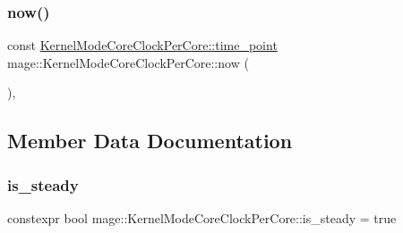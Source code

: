 \subsubsection{\texorpdfstring{now()}{now()}}
{\footnotesize\ttfamily const \hyperlink{structmage_1_1_kernel_mode_core_clock_per_core_a26d0fe6b051dab6987956f52414659cc}{Kernel\+Mode\+Core\+Clock\+Per\+Core\+::time\+\_\+point} mage\+::\+Kernel\+Mode\+Core\+Clock\+Per\+Core\+::now (\begin{DoxyParamCaption}{ }\end{DoxyParamCaption})\hspace{0.3cm}{\ttfamily [static]}, {\ttfamily [noexcept]}}



\subsection{Member Data Documentation}
\hypertarget{structmage_1_1_kernel_mode_core_clock_per_core_a8b87465ab1497015a4f6436fd4637645}{}\label{structmage_1_1_kernel_mode_core_clock_per_core_a8b87465ab1497015a4f6436fd4637645} 
\subsubsection{\texorpdfstring{is\+\_\+steady}{is\_steady}}
{\footnotesize\ttfamily constexpr bool mage\+::\+Kernel\+Mode\+Core\+Clock\+Per\+Core\+::is\+\_\+steady = true\hspace{0.3cm}{\ttfamily [static]}}

